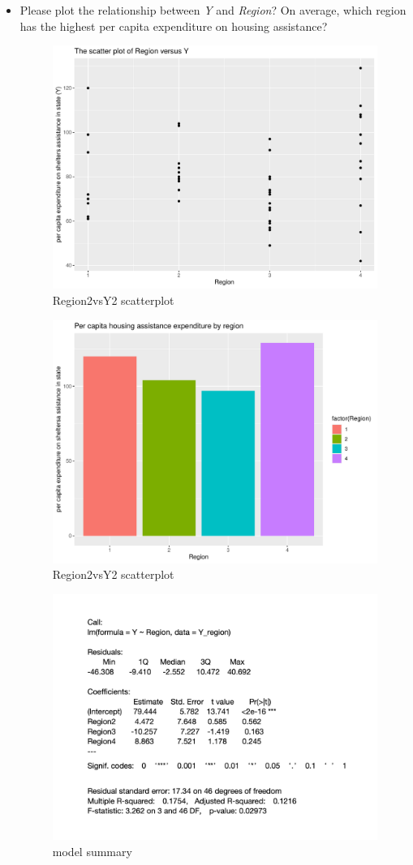 \documentclass[12pt,letterpaper]{article}
\begin{document}
\vspace{1cm}
\begin{itemize}
\item
Please plot the relationship between \emph{Y} and \emph{Region}? On average, which region has the highest per capita expenditure on housing assistance?

\vspace{.5cm}
\begin{figure}[h!]\centering
	\caption{\footnotesize Region2vsY2 scatterplot}
	\label{fig:Region2_vs_Y2}
	\includegraphics[width=.75\textwidth]{Region2_vs_Y2_scatterplot.pdf}
\end{figure}
\begin{figure}[h!]\centering
	\caption{\footnotesize Region2vsY2 scatterplot}
	\label{fig:Region1_vs_Y1}
	\includegraphics[width=.75\textwidth]{Region1_vs_Y1_barchart.pdf}
\end{figure}
\begin{figure}[h!]\centering
	\caption{\footnotesize model summary}
	\label{fig:regression model}
	\includegraphics[width=.75\textwidth]{model.png}

\end{figure}
\end{itemize}
\end{document}
